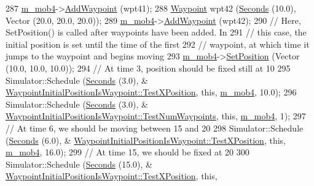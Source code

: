 \begin{DoxyCode}
287   \hyperlink{classWaypointInitialPositionIsWaypoint_a314ea7cc7f3a519067fb64153e6f3e2f}{m\_mob4}->\hyperlink{classns3_1_1WaypointMobilityModel_ae16c90c21c463289bbea2b3499a94643}{AddWaypoint} (wpt41);
288   \hyperlink{classns3_1_1Waypoint}{Waypoint} wpt42 (\hyperlink{group__timecivil_ga33c34b816f8ff6628e33d5c8e9713b9e}{Seconds} (10.0), Vector (20.0, 20.0, 20.0));
289   \hyperlink{classWaypointInitialPositionIsWaypoint_a314ea7cc7f3a519067fb64153e6f3e2f}{m\_mob4}->\hyperlink{classns3_1_1WaypointMobilityModel_ae16c90c21c463289bbea2b3499a94643}{AddWaypoint} (wpt42);
290   \textcolor{comment}{// Here, SetPosition() is called after waypoints have been added.  In}
291   \textcolor{comment}{// this case, the initial position is set until the time of the first}
292   \textcolor{comment}{// waypoint, at which time it jumps to the waypoint and begins moving}
293   \hyperlink{classWaypointInitialPositionIsWaypoint_a314ea7cc7f3a519067fb64153e6f3e2f}{m\_mob4}->\hyperlink{classns3_1_1MobilityModel_ac584b3d5a309709d2f13ed6ada1e7640}{SetPosition} (Vector (10.0, 10.0, 10.0));
294   \textcolor{comment}{// At time 3, position should be fixed still at 10}
295   Simulator::Schedule (\hyperlink{group__timecivil_ga33c34b816f8ff6628e33d5c8e9713b9e}{Seconds} (3.0), &
      \hyperlink{classWaypointInitialPositionIsWaypoint_aca01ac096251d1abe559ea98cad123e6}{WaypointInitialPositionIsWaypoint::TestXPosition}, \textcolor{keyword}{this}, 
      \hyperlink{classWaypointInitialPositionIsWaypoint_a314ea7cc7f3a519067fb64153e6f3e2f}{m\_mob4}, 10.0);
296   Simulator::Schedule (\hyperlink{group__timecivil_ga33c34b816f8ff6628e33d5c8e9713b9e}{Seconds} (3.0), &
      \hyperlink{classWaypointInitialPositionIsWaypoint_ac5c7ce5037e8704d07e7ed5cd1b8646f}{WaypointInitialPositionIsWaypoint::TestNumWaypoints}, \textcolor{keyword}{
      this}, \hyperlink{classWaypointInitialPositionIsWaypoint_a314ea7cc7f3a519067fb64153e6f3e2f}{m\_mob4}, 1);
297   \textcolor{comment}{// At time 6, we should be moving between 15 and 20}
298   Simulator::Schedule (\hyperlink{group__timecivil_ga33c34b816f8ff6628e33d5c8e9713b9e}{Seconds} (6.0), &
      \hyperlink{classWaypointInitialPositionIsWaypoint_aca01ac096251d1abe559ea98cad123e6}{WaypointInitialPositionIsWaypoint::TestXPosition}, \textcolor{keyword}{this}, 
      \hyperlink{classWaypointInitialPositionIsWaypoint_a314ea7cc7f3a519067fb64153e6f3e2f}{m\_mob4}, 16.0);
299   \textcolor{comment}{// At time 15, we should be fixed at 20}
300   Simulator::Schedule (\hyperlink{group__timecivil_ga33c34b816f8ff6628e33d5c8e9713b9e}{Seconds} (15.0), &
      \hyperlink{classWaypointInitialPositionIsWaypoint_aca01ac096251d1abe559ea98cad123e6}{WaypointInitialPositionIsWaypoint::TestXPosition}, \textcolor{keyword}{this}, 

\end{DoxyCode}
